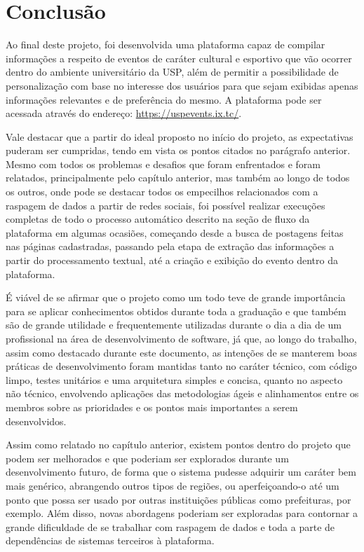 
\chapter{Conclusão}

Ao final deste projeto, foi desenvolvida uma plataforma capaz de compilar
informações a respeito de eventos de caráter cultural e esportivo que vão
ocorrer dentro do ambiente universitário da USP, além de permitir a
possibilidade de personalização com base no interesse dos usuários para que
sejam exibidas apenas informações relevantes e de preferência do mesmo. A
plataforma pode ser acessada através do endereço:
\url{https://uspevents.ix.tc/}.

Vale destacar que a partir do ideal proposto no início do projeto, as
expectativas puderam ser cumpridas, tendo em vista os pontos citados no
parágrafo anterior. Mesmo com todos os problemas e desafios que foram
enfrentados e foram relatados, principalmente pelo capítulo anterior, mas
também ao longo de todos os outros, onde pode se destacar todos os empecilhos
relacionados com a raspagem de dados a partir de redes sociais, foi possível
realizar execuções completas de todo o processo automático descrito na seção de
fluxo da plataforma em algumas ocasiões, começando desde a busca de postagens feitas nas
páginas cadastradas, passando pela etapa de extração das informações a partir do processamento textual, até a criação e exibição do evento dentro da plataforma.

É viável de se afirmar que o projeto como um todo teve de grande importância para se aplicar conhecimentos obtidos durante toda a graduação e que também são de grande utilidade e frequentemente utilizadas durante o dia a dia de um profissional na área de desenvolvimento de software, já que, ao longo do trabalho, assim como destacado durante este documento, as intenções de se manterem boas práticas de desenvolvimento foram mantidas tanto no caráter técnico, com código limpo, testes unitários e uma arquitetura simples e concisa, quanto no aspecto não técnico, envolvendo aplicações das metodologias ágeis e alinhamentos entre os membros sobre as prioridades e os pontos mais importantes a serem desenvolvidos.

Assim como relatado no capítulo anterior, existem pontos dentro do projeto que
podem ser melhorados e que poderiam ser explorados durante um
desenvolvimento futuro, de forma que o sistema pudesse adquirir um caráter bem
mais genérico, abrangendo outros tipos de regiões, ou aperfeiçoando-o até um
ponto que possa ser usado por outras instituições públicas como prefeituras, por exemplo.
Além disso, novas abordagens poderiam ser exploradas para contornar a grande
dificuldade de se trabalhar com raspagem de dados e toda a parte de
dependências de sistemas terceiros à plataforma.
